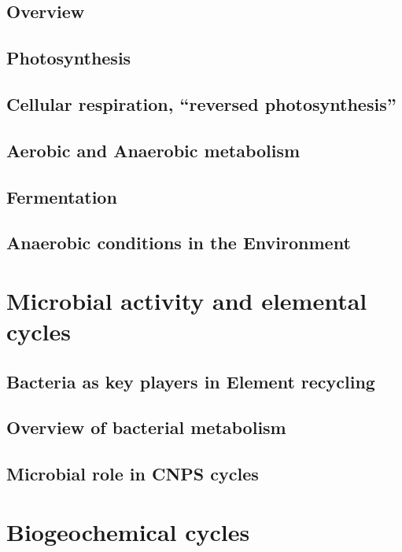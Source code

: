 \documentclass{article}
\begin{document}
\subsection{Overview}



\subsection{Photosynthesis}



\subsection{Cellular respiration, ``reversed photosynthesis''}



\subsection{Aerobic and Anaerobic metabolism}



\subsection{Fermentation}



\subsection{Anaerobic conditions in the Environment}



\section{Microbial activity and elemental cycles}
\subsection{Bacteria as key players in Element recycling}



\subsection{Overview of bacterial metabolism}



\subsection{Microbial role in CNPS cycles}



\section{Biogeochemical cycles}
\end{document}
